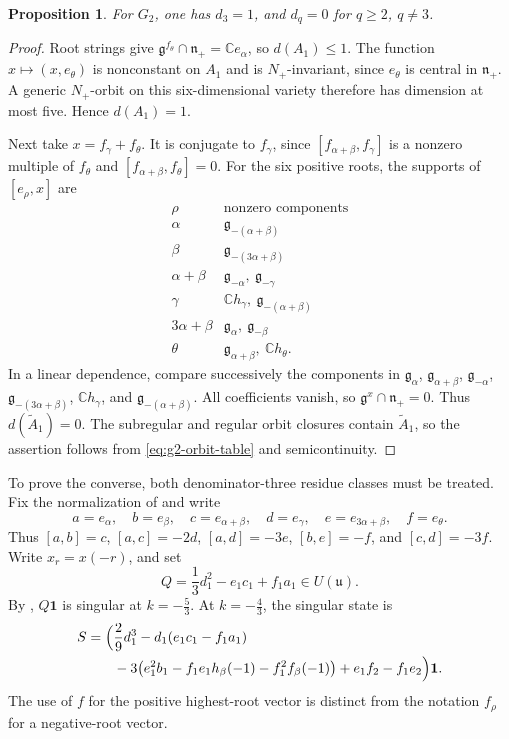 \documentclass[11pt]{amsart}
\newtheorem{proposition}[theorem]{Proposition}
\theoremstyle{definition}
\theoremstyle{remark}
\newcommand{\C}{\mathbb C}
\newcommand{\g}{\mathfrak g}
\newcommand{\n}{\mathfrak n_+}
\newcommand{\vac}{\mathbf1}
\begin{document}
\begin{proposition}\label{prop:g2-geometric}
For $G_2$, one has $d_3=1$, and $d_q=0$ for $q\ge2$, $q\ne3$.
\end{proposition}
\begin{proof}
Root strings give $\g^{f_\theta}\cap\n=\C e_\alpha$, so
$d(A_1)\le1$. The function $x\mapsto(x,e_\theta)$ is nonconstant
on $A_1$ and is $N_+$-invariant, since $e_\theta$ is central in
$\n$. A generic $N_+$-orbit on this six-dimensional variety
therefore has dimension at most five. Hence $d(A_1)=1$.

Next take $x=f_\gamma+f_\theta$. It is conjugate to $f_\gamma$,
since $[f_{\alpha+\beta},f_\gamma]$ is a nonzero multiple of
$f_\theta$ and $[f_{\alpha+\beta},f_\theta]=0$.
For the six positive roots, the supports of $[e_\rho,x]$ are
\[
\begin{array}{c|l}
\rho&\text{nonzero components}\\\hline
\alpha&\g_{-(\alpha+\beta)}\\
\beta&\g_{-(3\alpha+\beta)}\\
\alpha+\beta&\g_{-\alpha},\ \g_{-\gamma}\\
\gamma&\C h_\gamma,\ \g_{-(\alpha+\beta)}\\
3\alpha+\beta&\g_\alpha,\ \g_{-\beta}\\
\theta&\g_{\alpha+\beta},\ \C h_\theta.
\end{array}
\]
In a linear dependence, compare successively the components in
$\g_\alpha$, $\g_{\alpha+\beta}$, $\g_{-\alpha}$,
$\g_{-(3\alpha+\beta)}$, $\C h_\gamma$, and
$\g_{-(\alpha+\beta)}$. All coefficients vanish, so
$\g^x\cap\n=0$. Thus $d(\widetilde A_1)=0$.
The subregular and regular orbit closures contain
$\widetilde A_1$, so the assertion follows from
\eqref{eq:g2-orbit-table} and semicontinuity.
\end{proof}

To prove the converse, both denominator-three residue classes must
be treated. Fix the normalization of \cite{AL} and write
\[
 a=e_\alpha,\quad b=e_\beta,\quad c=e_{\alpha+\beta},\quad
 d=e_\gamma,\quad e=e_{3\alpha+\beta},\quad f=e_\theta.
\]
Thus $[a,b]=c$, $[a,c]=-2d$, $[a,d]=-3e$, $[b,e]=-f$,
and $[c,d]=-3f$. Write $x_r=x(-r)$, and set
\begin{equation}\label{eq:g2-Q}
 Q=\frac13d_1^2-e_1c_1+f_1a_1\in U(\mathfrak u).
\end{equation}
By \cite[Proposition~2.3]{AL}, $Q\vac$ is singular at
$k=-\frac53$. At $k=-\frac43$, the singular state is
\begin{equation}\label{eq:g2-cubic}
\begin{split}
 S=\Bigl(&\frac29d_1^3-d_1(e_1c_1-f_1a_1)\\
 &-3\bigl(e_1^2b_1-f_1e_1h_\beta(-1)-f_1^2f_\beta(-1)\bigr)
       +e_1f_2-f_1e_2\Bigr)\vac.
\end{split}
\end{equation}
The use of $f$ for the positive highest-root vector is distinct from
the notation $f_\rho$ for a negative-root vector.
\end{document}
